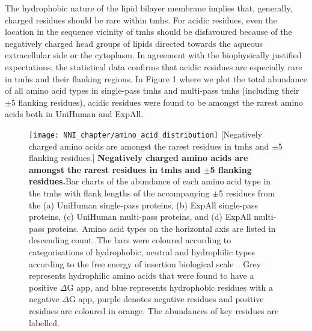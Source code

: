 The hydrophobic nature of the lipid bilayer membrane implies that, generally, charged residues should be rare within \gls{tmh}s. For acidic residues, even the location in the sequence vicinity of \gls{tmh}s should be disfavoured because of the negatively charged head groups of lipids directed towards the aqueous extracellular side or the cytoplasm. In agreement with the biophysically justified expectations, the statistical data confirms that acidic residues are especially rare in \gls{tmh}s and their flanking regions. In Figure 1 where we plot the total abundance of all amino acid types in single-pass \gls{tmh}s and multi-pass \gls{tmh}s (including their $\pm$5 flanking residues), acidic residues were found to be amongst the rarest amino acids both in UniHuman and ExpAll.

\begin{figure}[!ht]
\centering
\texttt{[image: NNI\_chapter/amino\_acid\_distribution]}
[Negatively charged amino acids are amongst the rarest residues in \gls{tmh}s and $\pm$5 flanking residues.] {\textbf{Negatively charged amino acids are amongst the rarest residues in \gls{tmh}s and $\pm$5 flanking residues.}Bar charts of the abundance of each amino acid type in the \gls{tmh}s with flank lengths of the accompanying $\pm$5 residues from the (a) UniHuman single-pass proteins, (b) ExpAll single-pass proteins, (c) UniHuman multi-pass proteins, and (d) ExpAll multi-pass proteins. Amino acid types on the horizontal axis are listed in descending count. The bars were coloured according to categorisations of hydrophobic, neutral and hydrophilic types according to the free energy of insertion biological scale~\cite{Hessa2005}. Grey represents hydrophilic amino acids that were found to have a positive $\Delta$G app, and blue represents hydrophobic residues with a negative $\Delta$G app, purple denotes negative residues and positive residues are coloured in orange. The abundances of key residues are labelled.}

\label{fig:amino_acid_distribution}
\end{figure}


